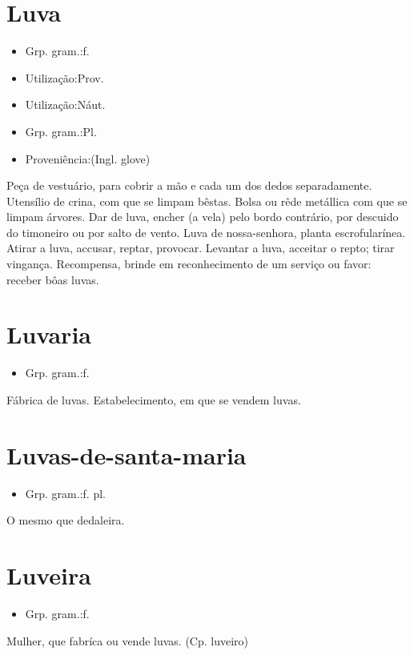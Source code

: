 \section{Luva}
\begin{itemize}
\item {Grp. gram.:f.}
\end{itemize}
\begin{itemize}
\item {Utilização:Prov.}
\end{itemize}
\begin{itemize}
\item {Utilização:Náut.}
\end{itemize}
\begin{itemize}
\item {Grp. gram.:Pl.}
\end{itemize}
\begin{itemize}
\item {Proveniência:(Ingl. \textunderscore glove\textunderscore )}
\end{itemize}
Peça de vestuário, para cobrir a mão e cada um dos dedos separadamente.
Utensílio de crina, com que se limpam bêstas.
Bolsa ou rêde metállica com que se limpam árvores.
\textunderscore Dar de luva\textunderscore , encher (a vela) pelo bordo contrário, por descuido do timoneiro ou por salto de vento.
\textunderscore Luva de nossa-senhora\textunderscore , planta escrofularínea.
\textunderscore Atirar a luva\textunderscore , accusar, reptar, provocar.
\textunderscore Levantar a luva\textunderscore , acceitar o repto; tirar vingança.
Recompensa, brinde em reconhecimento de um serviço ou favor: \textunderscore receber bôas luvas\textunderscore .
\section{Luvaria}
\begin{itemize}
\item {Grp. gram.:f.}
\end{itemize}
Fábrica de luvas.
Estabelecimento, em que se vendem luvas.
\section{Luvas-de-santa-maria}
\begin{itemize}
\item {Grp. gram.:f. pl.}
\end{itemize}
O mesmo que \textunderscore dedaleira\textunderscore .
\section{Luveira}
\begin{itemize}
\item {Grp. gram.:f.}
\end{itemize}
Mulher, que fabríca ou vende luvas.
(Cp. \textunderscore luveiro\textunderscore )
